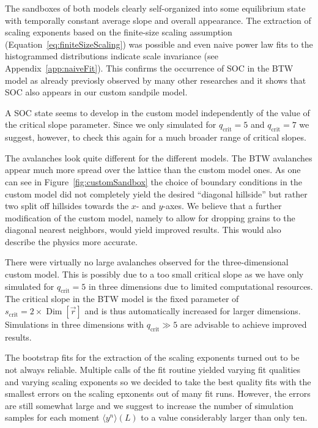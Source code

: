 The sandboxes of both models clearly self-organized into some equilibrium state with temporally constant average slope
and overall appearance. The extraction of scaling exponents based on the finite-size scaling assumption
(Equation~\eqref{eq:finiteSizeScaling}) was possible and even naive power law fits to the histogrammed distributions
indicate scale invariance (see Appendix~\ref{app:naiveFit}).
This confirms the occurrence of SOC in the BTW model as already previosly observed by many other researches
and it shows that SOC also appears in our custom sandpile model.

A SOC state seems to develop in the custom model independently of the value of the critical slope parameter.
Since we only simulated for $q_{\mathrm{crit}}=5$ and $q_{\mathrm{crit}}=7$ we suggest, however, to check this
again for a much broader range of critical slopes.

The avalanches look quite different for the different models. The BTW avalanches appear much more spread over the
lattice than the custom model ones. As one can see in Figure~\ref{fig:customSandbox} the choice of boundary conditions
in the custom model did not completely yield the desired \enquote{diagonal hillside} but rather two split off hillsides
towards the $x$- and $y$-axes. We believe that a further modification of the custom model, namely to allow for dropping
grains to the diagonal nearest neighbors, would yield improved results.
This would also describe the physics more accurate.

There were virtually no large avalanches observed for the three-dimensional custom model. This is possibly due to a
too small critical slope as we have only simulated for $q_{\mathrm{crit}}=5$ in three dimensions due to limited
computational resources.
The critical slope in the BTW model is the fixed parameter of $s_{\mathrm{crit}}=2\times\operatorname{Dim}
\left[\vec{r}\right]$ and is thus automatically increased for larger dimensions.
Simulations in three dimensions with $q_{\mathrm{crit}}\gg 5$ are advisable to achieve improved results.

The bootstrap fits for the extraction of the scaling exponents turned out to be not always reliable. Multiple calls
of the fit routine yielded varying fit qualities and varying scaling exponents so we decided to take the best quality
fits with the smallest errors on the scaling epxonents out of many fit runs. However, the errors are still somewhat
large and we suggest to increase the number of simulation samples for each moment $\langle y^n\rangle(L)$ to a value
considerably larger than only ten.

